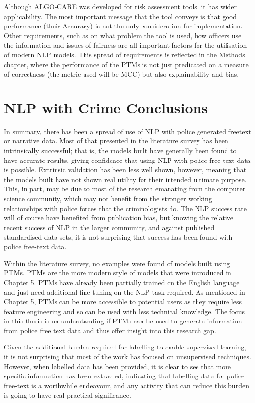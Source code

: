 Although ALGO-CARE was developed for risk assessment tools, it has wider applicability. The most important message that the tool conveys is that good performance (their Accuracy) is not the only consideration for implementation. Other requirements, such as on what problem the tool is used, how officers use the information and issues of fairness are all important factors for the utilisation of modern NLP models. This spread of requirements is reflected in the Methods chapter, where the performance of the PTMs is not just predicated on a measure of correctness (the metric used will be MCC) but also explainability and bias.


\section{ NLP with Crime Conclusions} In summary, there has been a spread of use of NLP with police generated freetext or narrative data. Most of that presented in the literature survey has been intrinsically successful; that is, the models built have generally been found to have accurate results, giving confidence that using NLP with police free text data is possible. Extrinsic validation has been less well shown, however, meaning that the models built have not shown real utility for their intended ultimate purpose. This, in part, may be due to most of the research emanating from the computer science community, which may not benefit from the stronger working relationships with police forces that the criminologists do. The NLP success rate will of course have benefited from publication bias, but knowing the relative recent success of NLP in the larger community, and against published standardised data sets, it is not surprising that success has been found with police free-text data.

Within the literature survey, no examples were found of models built using PTMs. PTMs are the more modern style of models that were introduced in Chapter 5. PTMs have already been partially trained on the English language and just need additional fine-tuning on the NLP task required. As mentioned in Chapter 5, PTMs can be more accessible to potential users as they require less feature engineering and so can be used with less technical knowledge. The focus in this thesis is on understanding if PTMs can be used to generate information from police free text data and thus offer insight into this research gap.

Given the additional burden required for labelling to enable supervised learning, it is not surprising that most of the work has focused on unsupervised techniques. However, when labelled data has been provided, it is clear to see that more specific information has been extracted, indicating that labelling data for police free-text is a worthwhile endeavour, and any activity that can reduce this burden is going to have real practical significance. 

